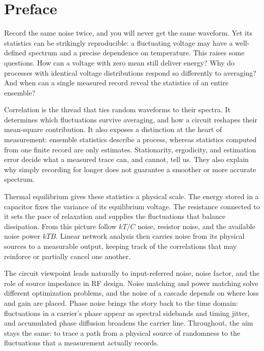 \section*{Preface}
Record the same noise twice, and you will never get the same waveform. Yet its statistics can be strikingly reproducible: a fluctuating voltage may have a well-defined spectrum and a precise dependence on temperature. This raises some questions. How can a voltage with zero mean still deliver energy? Why do processes with identical voltage distributions respond so differently to averaging? And when can a single measured record reveal the statistics of an entire ensemble?

Correlation is the thread that ties random waveforms to their spectra. It determines which fluctuations survive averaging, and how a circuit reshapes their mean-square contribution. It also exposes a distinction at the heart of measurement: ensemble statistics describe a process, whereas statistics computed from one finite record are only estimates. Stationarity, ergodicity, and estimation error decide what a measured trace can, and cannot, tell us. They also explain why simply recording for longer does not guarantee a smoother or more accurate spectrum.

Thermal equilibrium gives these statistics a physical scale. The energy stored in a capacitor fixes the variance of its equilibrium voltage. The resistance connected to it sets the pace of relaxation and supplies the fluctuations that balance dissipation. From this picture follow $kT/C$ noise, resistor noise, and the available noise power $kTB$. Linear network analysis then carries noise from its physical sources to a measurable output, keeping track of the correlations that may reinforce or partially cancel one another.

The circuit viewpoint leads naturally to input-referred noise, noise factor, and the role of source impedance in RF design. Noise matching and power matching solve different optimization problems, and the noise of a cascade depends on where loss and gain are placed. Phase noise brings the story back to the time domain: fluctuations in a carrier's phase appear as spectral sidebands and timing jitter, and accumulated phase diffusion broadens the carrier line. Throughout, the aim stays the same: to trace a path from a physical source of randomness to the fluctuations that a measurement actually records.
